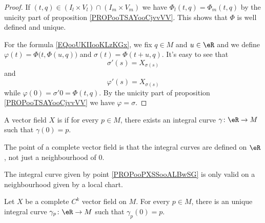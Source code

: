 \begin{proof}
	If \( (t,q)\in (I_l\times V_l)\cap(I_m\times V_m) \) we have \( \Phi_l(t,q)=\Phi_m(t,q)\) by the unicity part of proposition \ref{PROPooTSAYooCjvvVV}. This shows that \( \Phi\) is well defined and unique.

	For the formula \eqref{EQooUKIIooKLzKGx}, we fix \( q\in M\) and \( u\in \eR\) and we define \( \varphi(t)=\Phi\big( t,\Phi(u,q) \big)\) and \( \sigma(t)=\Phi(t+u,q)\). It's easy to see that
	\begin{equation}
		\sigma'(s)=X_{\sigma(s)}
	\end{equation}
	and
	\begin{equation}
		\varphi'(s)=X_{\sigma(s)}
	\end{equation}
	while \( \varphi(0)=\sigma'0=\Phi(t,q)\). By the unicity part of proposition \ref{PROPooTSAYooCjvvVV} we have \( \varphi=\sigma\).
\end{proof}


\begin{definition}  \label{DEFooMZSBooFkfKkS}
	A vector field \( X\) is  if for every \( p\in M\), there exists an integral curve \( \gamma\colon \eR\to M\) such that \( \gamma(0)=p\).
\end{definition}


The point of a complete vector field is that the integral curves are defined on \( \eR\), not just a neighbourhood of \( 0\).

The integral curve given by point \ref{PROPooPXSSooALBwSG} is only valid on a neighbourhood given by a local chart.


\begin{proposition}      \label{PROPooQNWOooBOxYtu}
	Let \( X\) be a complete \( C^k\) vector field on \( M\). For every \( p\in M\), there is an unique integral curve \( \gamma_p\colon \eR\to M\) such that \( \gamma_p(0)=p\).
\end{proposition}

